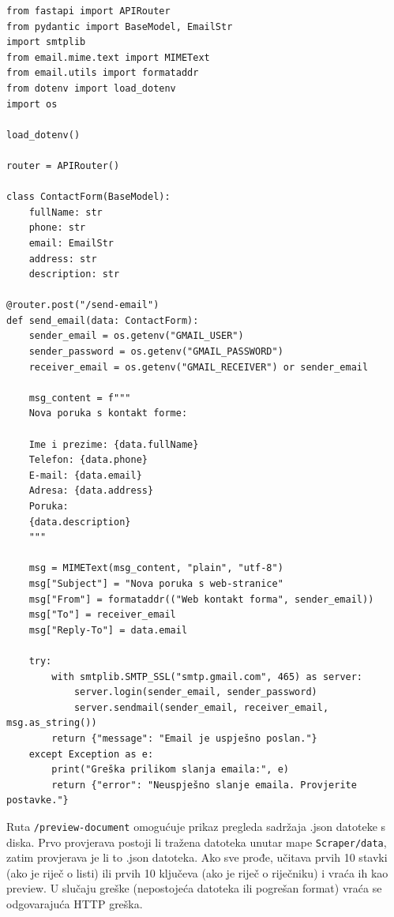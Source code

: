 \documentclass[]{foi}
\begin{document}
\begin{longlisting}
\begin{verbatim}
from fastapi import APIRouter
from pydantic import BaseModel, EmailStr
import smtplib
from email.mime.text import MIMEText
from email.utils import formataddr
from dotenv import load_dotenv
import os

load_dotenv()

router = APIRouter()

class ContactForm(BaseModel):
    fullName: str
    phone: str
    email: EmailStr
    address: str
    description: str

@router.post("/send-email")
def send_email(data: ContactForm):
    sender_email = os.getenv("GMAIL_USER")
    sender_password = os.getenv("GMAIL_PASSWORD")
    receiver_email = os.getenv("GMAIL_RECEIVER") or sender_email

    msg_content = f"""
    Nova poruka s kontakt forme:

    Ime i prezime: {data.fullName}
    Telefon: {data.phone}
    E-mail: {data.email}
    Adresa: {data.address}
    Poruka:
    {data.description}
    """

    msg = MIMEText(msg_content, "plain", "utf-8")
    msg["Subject"] = "Nova poruka s web-stranice"
    msg["From"] = formataddr(("Web kontakt forma", sender_email))
    msg["To"] = receiver_email
    msg["Reply-To"] = data.email  

    try:
        with smtplib.SMTP_SSL("smtp.gmail.com", 465) as server:
            server.login(sender_email, sender_password)
            server.sendmail(sender_email, receiver_email, msg.as_string())
        return {"message": "Email je uspješno poslan."}
    except Exception as e:
        print("Greška prilikom slanja emaila:", e)
        return {"error": "Neuspješno slanje emaila. Provjerite postavke."}
\end{verbatim}
\caption{email.py}
\label{lst:email}
\end{longlisting}

Ruta \verb|/preview-document| omogućuje prikaz pregleda sadržaja .json datoteke s diska. Prvo provjerava postoji li tražena datoteka unutar mape \verb|Scraper/data|, zatim
provjerava je li to .json datoteka. Ako sve prođe, učitava prvih 10 stavki (ako je riječ o listi) ili prvih 10 ključeva (ako je riječ o riječniku) i 
vraća ih kao preview. U slučaju greške (nepostojeća datoteka ili pogrešan format) vraća se odgovarajuća HTTP greška.
\end{document}
